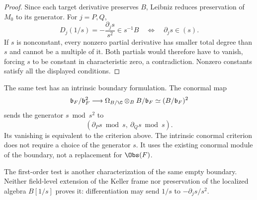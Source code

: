 \begin{proof}
Since each target derivative preserves \(B\), Leibniz reduces preservation
of \(M_0\) to its generator.  For \(j=P,Q\),
\[
  D_j(1/s)=-\frac{\partial_js}{s^2}\in s^{-1}B
  \quad\Longleftrightarrow\quad \partial_js\in(s).
\]
If \(s\) is nonconstant, every nonzero partial derivative has smaller
total degree than \(s\) and cannot be a multiple of it.  Both partials
would therefore have to vanish, forcing \(s\) to be constant in
characteristic zero, a contradiction.  Nonzero constants satisfy all
the displayed conditions.
\end{proof}

The same test has an intrinsic boundary formulation.  The conormal map
\cite{StacksConormalSequence}
\[
  \mathfrak b_F/\mathfrak b_F^2
  \longrightarrow
  \Omega_{B/\C}\otimes_B B/\mathfrak b_F
  \simeq (B/\mathfrak b_F)^2
\]
sends the generator \(s\bmod s^2\) to
\[
  (\partial_Ps\bmod s,\ \partial_Qs\bmod s).
\]
Its vanishing is equivalent to the criterion above.  The intrinsic
conormal criterion does not require a choice of the generator \(s\).
It uses the existing conormal module of the boundary, not a replacement
for \(\Obs(F)\).

The first-order test is another characterization of the same empty
boundary.  Neither field-level extension of the Keller frame nor
preservation of the localized algebra \(B[1/s]\) proves it: differentiation
may send \(1/s\) to \(-\partial_js/s^2\).
